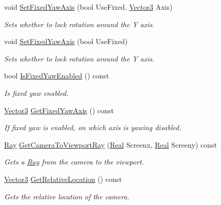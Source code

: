 \begin{DoxyCompactItemize}
void \hyperlink{classphys_1_1Camera_a0fe097fbabbe1a88881f25bc827cabf5}{SetFixedYawAxis} (bool UseFixed, \hyperlink{classphys_1_1Vector3}{Vector3} Axis)
\begin{DoxyCompactList}\small\item\em Sets whether to lock rotation around the Y axis. \item\end{DoxyCompactList}\item 
void \hyperlink{classphys_1_1Camera_a1b4d5be85c528541c7a1cbebb41bfd89}{SetFixedYawAxis} (bool UseFixed)
\begin{DoxyCompactList}\small\item\em Sets whether to lock rotation around the Y axis. \item\end{DoxyCompactList}\item 
bool \hyperlink{classphys_1_1Camera_a9b0aa17df46c427ab531bd587bd76e0f}{IsFixedYawEnabled} () const 
\begin{DoxyCompactList}\small\item\em Is fixed yaw enabled. \item\end{DoxyCompactList}\item 
\hyperlink{classphys_1_1Vector3}{Vector3} \hyperlink{classphys_1_1Camera_a1f4126761e14d9b960395c79b6c4f13f}{GetFixedYawAxis} () const 
\begin{DoxyCompactList}\small\item\em If fixed yaw is enabled, on which axis is yawing disabled. \item\end{DoxyCompactList}\item 
\hyperlink{classphys_1_1Ray}{Ray} \hyperlink{classphys_1_1Camera_a01d119eb8bd10a8654493b043110ca0f}{GetCameraToViewportRay} (\hyperlink{namespacephys_af7eb897198d265b8e868f45240230d5f}{Real} Screenx, \hyperlink{namespacephys_af7eb897198d265b8e868f45240230d5f}{Real} Screeny) const 
\begin{DoxyCompactList}\small\item\em Gets a \hyperlink{classphys_1_1Ray}{Ray} from the camera to the viewport. \item\end{DoxyCompactList}\item 
\hyperlink{classphys_1_1Vector3}{Vector3} \hyperlink{classphys_1_1Camera_ae3dc70090e83e19a9c5f6df302bb57a5}{GetRelativeLocation} () const 
\begin{DoxyCompactList}\small\item\em Gets the relative location of the camera. \item\end{DoxyCompactList}\item 

\end{DoxyCompactItemize}
